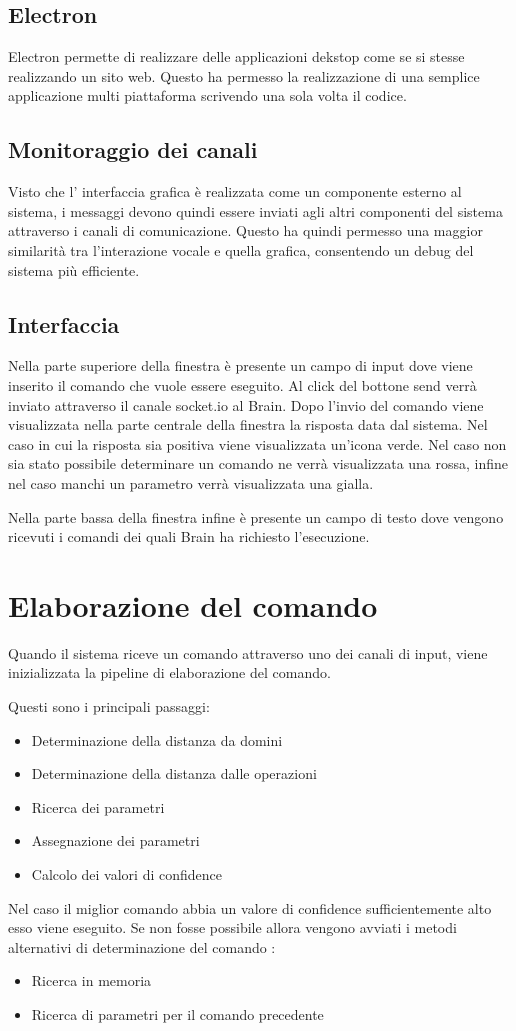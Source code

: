 \documentclass[twoside]{supsistudent}
\begin{document}
\section{Electron}
Electron permette di realizzare delle applicazioni dekstop come se si stesse realizzando un sito web. Questo ha permesso la realizzazione di una semplice applicazione multi piattaforma scrivendo una sola volta il codice.
\section{Monitoraggio dei canali}
Visto che l' interfaccia grafica è realizzata come un componente esterno al sistema, i messaggi devono quindi essere inviati agli altri componenti del sistema attraverso i canali di comunicazione. Questo ha quindi permesso una maggior similarità tra l'interazione vocale e quella grafica, consentendo un debug del sistema più efficiente.
\section{Interfaccia}
Nella parte superiore della finestra è presente un campo di input dove viene inserito il comando che vuole essere eseguito. Al click del bottone send verrà inviato attraverso il canale socket.io al Brain.
Dopo l'invio del comando viene visualizzata nella parte centrale della finestra la risposta data dal sistema.
Nel caso in cui la risposta sia positiva viene visualizzata un'icona verde. Nel caso non sia stato possibile determinare un comando ne verrà visualizzata una rossa, infine nel caso manchi un parametro verrà visualizzata una gialla.

Nella parte bassa della finestra infine è presente un campo di testo dove vengono ricevuti i comandi dei quali Brain ha richiesto l'esecuzione.
\chapter{Elaborazione del comando}
Quando il sistema riceve un comando attraverso uno dei canali di input, viene inizializzata la pipeline di elaborazione del comando.

Questi sono i principali passaggi: 
\begin{itemize}
	\item Determinazione della distanza da domini
	\item Determinazione della distanza dalle operazioni
	\item Ricerca dei parametri
	\item Assegnazione dei parametri
	\item Calcolo dei valori di confidence
\end{itemize}
Nel caso il miglior comando abbia un valore di confidence sufficientemente alto esso viene eseguito. Se non fosse possibile allora vengono avviati i metodi alternativi di determinazione del comando :
\begin{itemize}
	\item Ricerca in memoria
	\item Ricerca di parametri per il comando precedente
\end{itemize}
\end{document}
